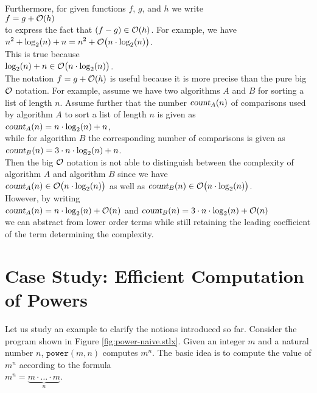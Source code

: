 Furthermore, for given functions $f$, $g$, and $h$ we write
\\[0.2cm]
\hspace*{1.3cm}
$f = g + \mathcal{O}(h)$
\\[0.2cm]
to express the fact that  $(f - g) \in \mathcal{O}(h)$.  For example, we have 
\\[0.2cm]
\hspace*{1.3cm}
$\displaystyle n^2 + \log_2(n) + n = n^2 + \mathcal{O}\bigl(n \cdot \log_2(n)\bigr)$.
\\[0.2cm]
This is true because
\\[0.2cm]
\hspace*{1.3cm}
$\displaystyle \log_2(n) + n \in \mathcal{O}\bigl(n \cdot \log_2(n)\bigr)$.
\\[0.2cm] 
The notation $f = g + \mathcal{O}(h)$ is useful because it is more precise than the pure big $\mathcal{O}$
notation.  For example, assume we have two algorithms $A$ and $B$ for sorting a list of length
$n$.  Assume further that the number $\textsl{count}_A(n)$ of comparisons used by algorithm $A$ to sort a list of
length $n$ is given as
\\[0.2cm]
\hspace*{1.3cm}
$\displaystyle\textsl{count}_A(n) = n \cdot \log_2(n) + n$,
\\[0.2cm]
while for algorithm $B$ the corresponding number of comparisons is given as
\\[0.2cm]
\hspace*{1.3cm}
$\displaystyle\textsl{count}_B(n) = 3 \cdot n \cdot \log_2(n) + n$.
\\[0.2cm]
Then the big $\mathcal{O}$ notation is not able to distinguish between the complexity of algorithm $A$ and
algorithm $B$ since we have
\\[0.2cm]
\hspace*{1.3cm}
$\textsl{count}_A(n) \in \mathcal{O}\bigl(n \cdot \log_2(n)\bigr)$ \quad as well as \quad
$\textsl{count}_B(n) \in \mathcal{O}\bigl(n \cdot \log_2(n)\bigr)$.
\\[0.2cm]
However, by writing
\\[0.2cm]
\hspace*{1.3cm}
$\displaystyle\textsl{count}_A(n) = n \cdot \log_2(n) + \mathcal{O}(n)$ \quad and \quad
$\displaystyle\textsl{count}_B(n) = 3 \cdot n \cdot \log_2(n) + \mathcal{O}(n)$
\\[0.2cm]
we can abstract from lower order terms while still retaining the leading coefficient of the term
determining the complexity.  
\pagebreak

\section[Computation of Powers]{Case Study:  Efficient Computation of Powers}
Let us study an example to clarify the notions introduced so far.  
Consider the program shown in Figure \ref{fig:power-naive.stlx}.  Given an integer $m$ and a
natural number $n$, $\mathtt{power}(m, n)$ computes $m^n$.
The basic idea is to compute the value of $m^n$ according to the formula \\[0.2cm]
\hspace*{1.3cm} 
$m^n = \underbrace{m \cdot {\dots} \cdot m}_n$. 


